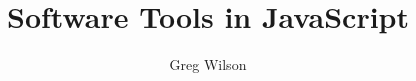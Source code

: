 \documentclass[krantzl]{tex/krantz}
\begin{document}
\title{Software Tools in JavaScript}
\author{Greg Wilson}
\maketitle

\frontmatter
\tableofcontents

\mainmatter
\end{document}
